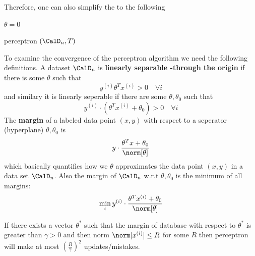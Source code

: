 Therefore, one can also simplify the  to the following

\begin{algorithm}[H]
    \DontPrintSemicolon
    $\theta = 0 $\;

    \Return{$\theta $}
    \caption{ perceptron $(\CalD_n , T )$}
\end{algorithm}

To examine the convergence of the perceptron algorithm we need the following definitions. A dataset \(\CalD_n\) is \textbf{linearly separable -through the origin} if there is some \(\theta\) such that
\begin{equation*}
    y^{(i)} \theta^T x^{(i)} > 0 \quad \forall i
\end{equation*}
and similary it is linearly seperable if there are some \(\theta , \theta_0\) such that 
\begin{equation*}
    y^{(i)} \cdot \left( \theta^T x^{(i)}  + \theta_0 \right) > 0 \quad \forall i
\end{equation*}
The \textbf{margin} of a labeled data point \((x,y)\) with respect to a seperator (hyperplane) \(\theta, \theta_0\) is
\begin{equation*}
    y \cdot \dfrac{\theta^T x +  \theta_0}{\norm[\theta]}
\end{equation*}
which basically quantifies how we \(\theta\) approximates the data point \((x,y)\) in a data set \(\CalD_n\). Also the margin of \(\CalD_n\) w.r.t \(\theta, \theta_0\) is
the minimum of all margins:
\begin{equation*}
    \min_i     y^{(i)} \cdot \dfrac{\theta^T x^{(i)} + \theta_0}{\norm[\theta]}
\end{equation*}

\begin{theorem} 
    If there exists a vector \(\theta^\ast\) such that the margin of database with respect to \(\theta^\ast\) is greater than \(\gamma > 0\) and then norm \(\norm[x^{(i)}] \leq R\) for some \(R\) then perceptron will make at most \(\left(\frac{R}{\gamma} \right)^2\) updates/mistakes.
\end{theorem}

